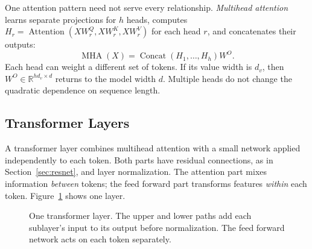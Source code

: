 One attention pattern need not serve every relationship. \emph{Multihead
attention} learns separate projections for $h$ heads, computes
$H_r=\operatorname{Attention}(XW_r^Q,XW_r^K,XW_r^V)$ for each head $r$, and
concatenates their outputs:
\begin{equation}
  \operatorname{MHA}(X)=
  \operatorname{Concat}(H_1,\ldots,H_h)W^O.
  \label{eq:transformer-mha}
\end{equation}
\noindent
Each head can weight a different set of tokens. If its value width is $d_v$,
then $W^O\in\mathbb R^{hd_v\times d}$ returns to the model width $d$.
Multiple heads do not change the quadratic dependence on sequence length.

\subsection{Transformer Layers}

A transformer layer combines multihead attention with a small network applied
independently to each token. Both parts have residual connections, as in
Section~\ref{sec:resnet}, and layer normalization. The attention part mixes
information \emph{between} tokens; the feed forward part transforms features
\emph{within} each token. Figure~\ref{fig:transformer-layer} shows one layer.

\begin{figure}[ht]
  \centering
  \caption{One transformer layer. The upper and lower paths add each
  sublayer's input to its output before normalization. The feed forward
  network acts on each token separately.}
  \label{fig:transformer-layer}
\end{figure}

